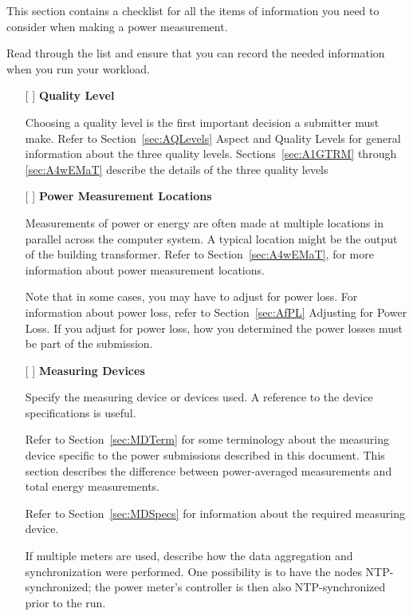 \label{sec:checklist}


\noindent
This section contains a checklist for all the items of information you need 
to consider when making a power measurement. 
\wl

\noindent
Read through the list and ensure that you can record the needed 
information when you run your workload.
\wl

\begin{itemize}
\item[{[ ]}]
\textbf{Quality Level}

Choosing a quality level is the first important decision a submitter must make. Refer to 
Section~\ref{sec:AQLevels} Aspect and Quality Levels for general information about the three quality levels.  
Sections~\ref{sec:A1GTRM} through \ref{sec:A4wEMaT} describe the details of the three quality levels

\item[{[ ]}]
\textbf{Power Measurement Locations}

Measurements of power or energy are often made at multiple locations in parallel across the computer system. A typical location might be the output of the building transformer.
Refer to Section~\ref{sec:A4wEMaT}, 
for more information about power measurement locations.

Note that in some cases, you may have to adjust for power loss. For information about power loss, refer to 
Section~\ref{sec:AfPL} Adjusting for Power Loss.  If you adjust for power loss, how you determined the power losses must be part of the submission.


\newpage

\item[{[ ]}]
\textbf{Measuring Devices}

Specify the measuring device or devices used. A reference to the device specifications is useful.

Refer to Section~\ref{sec:MDTerm} for some terminology about the measuring device specific to the power submissions described in this document. This section describes the difference between power-averaged measurements and total energy measurements.

Refer to Section~\ref{sec:MDSpecs} for information about the required measuring device.

If multiple meters are used, describe how the data aggregation and synchronization were performed. One possibility is to have the nodes NTP-synchronized; the power meter's controller is then also NTP-synchronized prior to the run.


\end{itemize}
